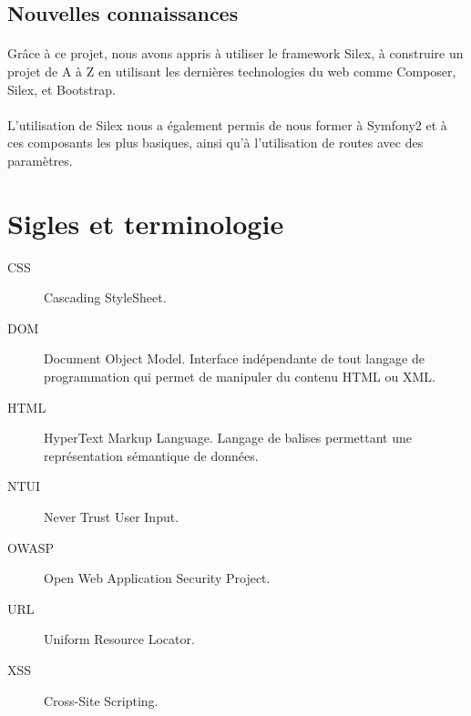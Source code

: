 \documentclass[12pt]{article}
\begin{document}
    \subsection{Nouvelles connaissances}
        \paragraph{}Grâce à ce projet, nous avons appris à utiliser le framework Silex, à construire un projet de A à Z en utilisant les dernières technologies du web comme Composer, Silex, et Bootstrap. 
        \paragraph{}L'utilisation de Silex nous a également permis de nous former à Symfony2 et à ces composants les plus basiques, ainsi qu'à l'utilisation de routes avec des paramètres.
    
\section{Sigles et terminologie}
    \begin{description}
        \item[CSS] Cascading StyleSheet.
        \item[DOM] Document Object Model. Interface indépendante de tout langage de programmation qui permet de manipuler du contenu HTML ou XML.
        \item[HTML] HyperText Markup Language. Langage de balises permettant une représentation sémantique de données.
        \item[NTUI] Never Trust User Input.
        \item[OWASP] Open Web Application Security Project.
        \item[URL] Uniform Resource Locator.
        \item[XSS] Cross-Site Scripting.
    \end{description}
\end{document}
